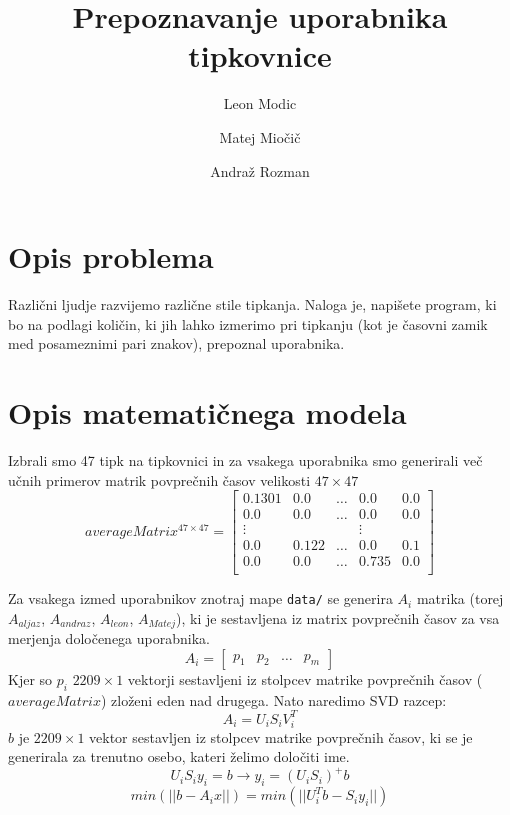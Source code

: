 \documentclass[12pt]{article}
\begin{document}
\title{\textbf{Prepoznavanje uporabnika tipkovnice}}
\author{
  Leon Modic\\
  \and
  Matej Miočič\\
  \and
  Andraž Rozman\\
}
\maketitle

\section{Opis problema}
Različni ljudje razvijemo različne stile tipkanja. Naloga je, napišete program,
ki bo na podlagi količin, ki jih lahko izmerimo pri tipkanju (kot je časovni
zamik med posameznimi pari znakov), prepoznal uporabnika.

\section{Opis matematičnega modela}
Izbrali smo 47 tipk na tipkovnici in za vsakega uporabnika smo generirali več učnih
primerov matrik povprečnih časov velikosti $47 \times 47$
\[
  averageMatrix^{47 \times 47}=
  \begin{bmatrix}
    0.1301 & 0.0 & \dots & 0.0 & 0.0\\
    0.0 & 0.0 & \dots & 0.0 & 0.0\\
    \vdots & & & \vdots\\
    0.0 & 0.122 & \dots & 0.0 & 0.1\\
    0.0 & 0.0 & \dots & 0.735 & 0.0\\
  \end{bmatrix}
\]

Za vsakega izmed uporabnikov znotraj mape \texttt{data/} se generira $A_i$ matrika
(torej $A_{aljaz}$, $A_{andraz}$, $A_{leon}$, $A_{Matej}$), ki je sestavljena iz matrix povprečnih
časov za vsa merjenja določenega uporabnika.
\[
  A_i = \begin{bmatrix}
    p_1 & p_2 & \dots & p_m
  \end{bmatrix}
\]
Kjer so $p_i$ $2209 \times 1$ vektorji sestavljeni iz stolpcev matrike povprečnih časov ($averageMatrix$) zloženi
eden nad drugega. Nato naredimo SVD razcep:
$$A_i=U_iS_iV_i^T$$
$b$ je $2209 \times 1$ vektor sestavljen iz stolpcev matrike povprečnih časov, ki se je generirala za trenutno osebo, kateri želimo
določiti ime.
$$U_iS_iy_i = b \rightarrow y_i = (U_iS_i)^+b$$
$$min(||b-A_ix||) = min(||U_i^Tb-S_iy_i||)$$
\end{document}
